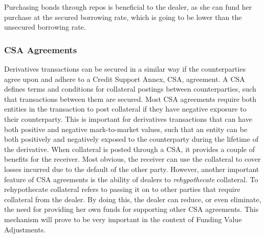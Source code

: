 \documentclass[main.tex]{subfiles}
\begin{document}
        Purchasing bonds through repos is beneficial to the dealer,
        as she can fund her purchase at the secured borrowing rate,
        which is going to be lower than the unsecured borrowing rate.

        \subsubsection{CSA Agreements}
        Derivatives transactions can be secured in a similar way 
        if the counterparties agree upon and adhere to a Credit Support Annex, CSA, agreement.
        A CSA defines terms and conditions for collateral postings between counterparties, 
        such that transactions between them are secured.
        Most CSA agreements require both entities in the transaction to post collateral 
        if they have negative exposure to their counterparty. 
        This is important for derivatives transactions that can have both 
        positive and negative mark-to-market values, 
        such that an entity can be both positively and negatively exposed to the counterparty
        during the lifetime of the derivative.
        When collateral is posted through a CSA, it provides a couple of benefits for the receiver.
        Most obvious, the receiver can use the collateral to cover losses incurred 
        due to the default of the other party.
        However, another important feature of CSA agreements is the ability of dealers to
        \textit{rehypothecate} collateral.
        To rehypothecate collateral refers to passing it on to other parties that
        require collateral from the dealer.
        By doing this, the dealer can reduce, or even eliminate, the need for providing her own funds
        for supporting other CSA agreements. 
        This mechanism will prove to be very important in the context of Funding Value Adjustments.
\end{document}
